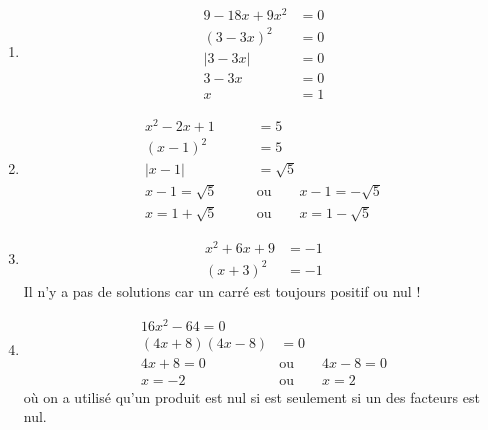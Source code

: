 {\begin{enumerate}
		\item
		\begin{align*}
			9 - 18x + 9x^2 &= 0 \\
			(3-3x)^2 &= 0 \\
			|3-3x| &= 0 \\
			3-3x &= 0 \\
			x&=1
		\end{align*}
		\item 
		\begin{align*}
			x^2 - 2x + 1 &= 5 \\
			(x-1)^2 &= 5 \\
			|x-1| &= \sqrt{5} \\
			x-1=\sqrt{5} \qquad & \text{ou} \qquad x-1=-\sqrt{5} \\
			x=1+\sqrt{5} \qquad & \text{ou} \qquad x=1-\sqrt{5}
		\end{align*}
		\item 
		\begin{align*}
			x^2 +6x + 9 &= -1 \\
			(x+3)^2 &= -1 
		\end{align*}
		Il n'y a pas de solutions car un carré est toujours positif ou nul !
		\item 
		\begin{align*}
			16x^2 - 64 = 0 \\
			(4x+8)(4x-8) &= 0 \\
			4x+8=0 \qquad & \text{ou} \qquad 4x-8=0 \\
			x=-2 \qquad & \text{ou} \qquad x=2
		\end{align*}
		où on a utilisé qu'un produit est nul si est seulement si un des facteurs est nul.
	\end{enumerate}
}








